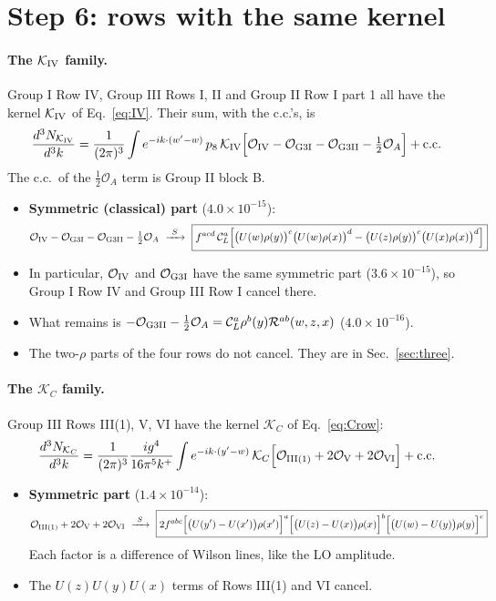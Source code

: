 \documentclass[10pt]{article}
\numberwithin{equation}{section}
\newcommand{\CL}{\mathcal C_L}
\newcommand{\Rc}{\mathcal R}
\newcommand{\OO}{\mathcal O}
\newcommand{\KK}{\mathcal K}
\newcommand{\pre}{\frac{1}{(2\pi)^3}}
\newcommand{\phw}{e^{-ik\cdot(w'-w)}}
\begin{document}
\section{Step 6: rows with the same kernel}\label{sec:families}
\paragraph{The $\KK_{\rm IV}$ family.} Group I Row IV, Group III Rows I, II and Group II Row I part 1 all have the kernel $\KK_{\rm IV}$ of Eq.~\eqref{eq:IV}. Their sum, with the c.c.'s, is
\begin{equation}
\frac{d^3N_{\KK_{\rm IV}}}{d^3k}=\pre\int\phw\,p_8\,\KK_{\rm IV}\Big[\OO_{\rm IV}-\OO_{\rm G3I}-\OO_{\rm G3II}-\tfrac12\OO_A\Big]+{\rm c.c.}
\label{eq:famIV}
\end{equation}
The c.c.\ of the $\frac12\OO_A$ term is Group II block B.
\begin{itemize}
\item \textbf{Symmetric (classical) part} ($4.0\times10^{-15}$):
\begin{equation}
\OO_{\rm IV}-\OO_{\rm G3I}-\OO_{\rm G3II}-\tfrac12\OO_A\ \xrightarrow{\ S\ }\ \boxed{f^{acd}\,\CL^a\Big[\big(U(w)\rho(y)\big)^c\big(U(w)\rho(x)\big)^d-\big(U(z)\rho(y)\big)^c\big(U(x)\rho(x)\big)^d\Big]}
\label{eq:famIVs}
\end{equation}
\item In particular, $\OO_{\rm IV}$ and $\OO_{\rm G3I}$ have the same symmetric part ($3.6\times10^{-15}$), so Group I Row IV and Group III Row I cancel there.
\item What remains is $-\OO_{\rm G3II}-\frac12\OO_A=\CL^a\rho^b(y)\Rc^{ab}(w,z,x)$ ($4.0\times10^{-16}$).
\item The two-$\rho$ parts of the four rows do not cancel. They are in Sec.~\ref{sec:three}.
\end{itemize}

\paragraph{The $\KK_C$ family.} Group III Rows III(1), V, VI have the kernel $\KK_C$ of Eq.~\eqref{eq:Crow}:
\begin{equation}
\frac{d^3N_{\KK_C}}{d^3k}=\pre\frac{ig^4}{16\pi^5k^+}\int e^{-ik\cdot(y'-w)}\,\KK_C\Big[\OO_{\rm III(1)}+2\OO_{\rm V}+2\OO_{\rm VI}\Big]+{\rm c.c.}
\label{eq:famC}
\end{equation}
\begin{itemize}
\item \textbf{Symmetric part} ($1.4\times10^{-14}$):
\begin{equation}
\OO_{\rm III(1)}+2\OO_{\rm V}+2\OO_{\rm VI}\ \xrightarrow{\ S\ }\ \boxed{2f^{abc}\Big[\big(U(y')-U(x')\big)\rho(x')\Big]^a\Big[\big(U(z)-U(x)\big)\rho(x)\Big]^b\Big[\big(U(w)-U(y)\big)\rho(y)\Big]^c}
\label{eq:famCs}
\end{equation}
Each factor is a difference of Wilson lines, like the LO amplitude.
\item The $U(z)U(y)U(x)$ terms of Rows III(1) and VI cancel.
\end{itemize}
\end{document}
